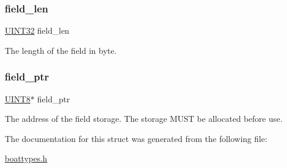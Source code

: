 \subsubsection{\texorpdfstring{field\+\_\+len}{field\_len}}
{\footnotesize\ttfamily \mbox{\hyperlink{boattypes_8h_ae1e6edbbc26d6fbc71a90190d0266018}{U\+I\+N\+T32}} field\+\_\+len}



The length of the field in byte. 

\mbox{\label{struct_t_tx_field_variable_aa9767f761e81f0c09d5cd7690d63578b}} 
\subsubsection{\texorpdfstring{field\+\_\+ptr}{field\_ptr}}
{\footnotesize\ttfamily \mbox{\hyperlink{boattypes_8h_ab27e9918b538ce9d8ca692479b375b6a}{U\+I\+N\+T8}}$\ast$ field\+\_\+ptr}



The address of the field storage. The storage M\+U\+ST be allocated before use. 



The documentation for this struct was generated from the following file\+:\begin{DoxyCompactItemize}
\item 
\mbox{\hyperlink{boattypes_8h}{boattypes.\+h}}\end{DoxyCompactItemize}
